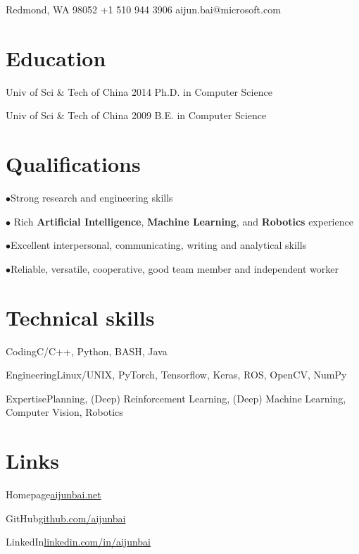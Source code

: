 \documentclass{tccv}
\begin{document}
\personal
{Redmond, WA 98052}
{+1 510 944 3906}
{aijun.bai@microsoft.com}

\section{Education}

\begin{yearlist}																	
	\item[Univ of Sci \& Tech of China]{2014}
	{Ph.D. in Computer Science}
													    
	\item[Univ of Sci \& Tech of China]{2009}
	{B.E. in Computer Science}
													    
\end{yearlist}

\section{Qualifications}

\begin{factlist}									
	\item{$\bullet$}{Strong research and engineering skills}
	\item{$\bullet$}{ Rich {\bf Artificial Intelligence}, {\bf Machine Learning}, and {\bf Robotics} experience}
	\item{$\bullet$}{Excellent interpersonal, communicating, writing and analytical skills}
	\item{$\bullet$}{Reliable, versatile, cooperative, good team member and independent worker}														
\end{factlist}

\section{Technical skills}

\begin{factlist}
	\item{Coding}{C/C++, Python, BASH, Java}
	\item{Engineering}{Linux/UNIX, PyTorch, Tensorflow, Keras, ROS, OpenCV, NumPy}
	\item{Expertise}{Planning, (Deep) Reinforcement Learning, (Deep) Machine Learning, Computer Vision, Robotics}
\end{factlist}

\section{Links}

\begin{factlist}
	\item{Homepage}{\href{http://aijunbai.github.io/}{aijunbai.net}}
	\item{GitHub}{\href{https://github.com/aijunbai}{github.com/aijunbai}} 
	\item{LinkedIn}{\href{https://www.linkedin.com/in/aijunbai}{linkedin.com/in/aijunbai}}
\end{factlist}
\end{document}
